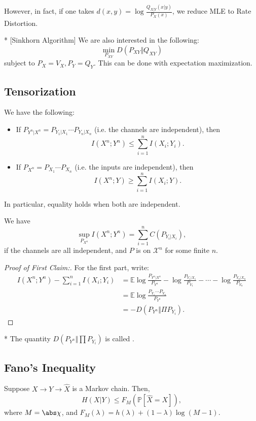 However, in fact, if one takes $d(x,y) = \log \frac{Q_{X|Y} (x|y)}{P_X(x)}$, we reduce MLE to Rate Distortion. 

\begin{cor}*
	[Sinkhorn Algorithm]
	We are also interested in the following:
	\[
		\min_{P_{XY}} D(P_{XY}\Vert Q_{XY})
	\]
	subject to $P_X = V_X, P_Y = Q_Y$. This can be done with expectation maximization.
\end{cor}

\subsection{Tensorization}

\begin{thm}
	We have the following:
	\begin{itemize}
		\item If $P_{Y^n|X^n} = P_{Y_1|X_1} \cdots P_{Y_n|X_n}$ (i.e. the channels are independent), then \[
				I(X^n;Y^n) \leq \sum_{i=1}^n I(X_i; Y_i).
			\]
		\item If $P_{X^n} = P_{X_1}\cdots P_{X_n}$ (i.e. the inputs are independent), then \[
				I(X^n;Y) \geq \sum_{i=1}^n I(X_i; Y).
			\]
	\end{itemize}	
	In particular, equality holds when both are independent.
\end{thm}

\begin{cor}
	[Tensorization]
	We have \[
		\sup_{P_{X^n}} I(X^n; Y^n) = \sum_{i=1}^n C(P_{Y_i | X_i}),
	\]
	if the channels are all independent, and $P$ is on $\mathcal X^n$ for some finite $n$. 
\end{cor}

\begin{proof}
	[Proof of First Claim:]
	For the first part, write: \begin{align*}
		I(X^n;Y^n) - \sum_{i=1}^n I(X_i; Y_i) &= \mathbb E \log \frac{P_{Y^n|X^n}}{P_{Y^n}} - \log \frac{P_{Y_1|X_1}}{P_{Y_1}} - \cdots - \log \frac{P_{Y_n | X_n}}{P_{Y_n}} \\
		&= \mathbb E \log \frac{P_{Y_1} \cdots P_{Y_n}}{P_{Y^n}} \\
		&= -D(P_{Y^n} \Vert \Pi P_{Y_i}).
	\end{align*}
\end{proof}

\begin{defn}*
	The quantity $D(P_{Y^n}\Vert \prod P_{Y_i})$ is called .
\end{defn}

\subsection{Fano's Inequality}

\begin{thm}
	Suppose $X\to Y\to \hat X$ is a Markov chain. Then, \[
		H(X|Y) \leq F_M(\mathbb P[\hat X = X]),
	\]
	where $M = \abs \chi$, and $F_M(\lambda) = h(\lambda) + (1-\lambda) \log (M-1)$.
\end{thm}
